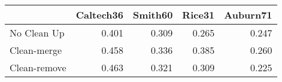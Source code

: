 \begin{tabular}{lrrrr}
\toprule
{} & Caltech36 & Smith60 & Rice31 & Auburn71 \\
\midrule
No Clean Up  &     0.401 &   0.309 &  0.265 &    0.247 \\
Clean-merge  &     0.458 &   0.336 &  0.385 &    0.260 \\
Clean-remove &     0.463 &   0.321 &  0.309 &    0.225 \\
\bottomrule
\end{tabular}
